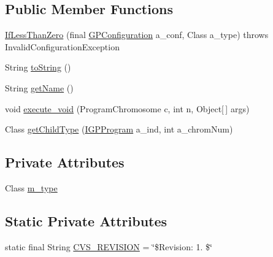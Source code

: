 \subsection*{Public Member Functions}
\begin{DoxyCompactItemize}
\item 
\hyperlink{classexamples_1_1gp_1_1painted_desert_1_1_if_less_than_zero_ab37f9a18f6678bb1171282d0d9acbc06}{If\-Less\-Than\-Zero} (final \hyperlink{classorg_1_1jgap_1_1gp_1_1impl_1_1_g_p_configuration}{G\-P\-Configuration} a\-\_\-conf, Class a\-\_\-type)  throws Invalid\-Configuration\-Exception 
\item 
String \hyperlink{classexamples_1_1gp_1_1painted_desert_1_1_if_less_than_zero_a523663c2e675f7b6465896cf84a9bea0}{to\-String} ()
\item 
String \hyperlink{classexamples_1_1gp_1_1painted_desert_1_1_if_less_than_zero_ad536d5667107fb6200bea705303a75ed}{get\-Name} ()
\item 
void \hyperlink{classexamples_1_1gp_1_1painted_desert_1_1_if_less_than_zero_a75a687cf241716c13db790b786a6612b}{execute\-\_\-void} (Program\-Chromosome c, int n, Object\mbox{[}$\,$\mbox{]} args)
\item 
Class \hyperlink{classexamples_1_1gp_1_1painted_desert_1_1_if_less_than_zero_ae2d5a39a5eea086747963aa7e982b42a}{get\-Child\-Type} (\hyperlink{interfaceorg_1_1jgap_1_1gp_1_1_i_g_p_program}{I\-G\-P\-Program} a\-\_\-ind, int a\-\_\-chrom\-Num)
\end{DoxyCompactItemize}
\subsection*{Private Attributes}
\begin{DoxyCompactItemize}
\item 
Class \hyperlink{classexamples_1_1gp_1_1painted_desert_1_1_if_less_than_zero_ad145341a3a5ceb25ba7e3e35ba7b517c}{m\-\_\-type}
\end{DoxyCompactItemize}
\subsection*{Static Private Attributes}
\begin{DoxyCompactItemize}
\item 
static final String \hyperlink{classexamples_1_1gp_1_1painted_desert_1_1_if_less_than_zero_a93bcc270ca4f73efa52074dd146b57a8}{C\-V\-S\-\_\-\-R\-E\-V\-I\-S\-I\-O\-N} = \char`\"{}\$Revision\-: 1. \$\char`\"{}
\end{DoxyCompactItemize}
